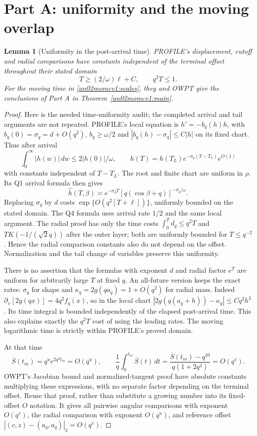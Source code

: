 \documentclass[11pt]{article}
\newtheorem{lemma}[theorem]{Lemma}
\theoremstyle{remark}\newtheorem{remark}[theorem]{Remark}
\newcommand{\dd}{\,d}
\begin{document}
\section{Part A: uniformity and the moving overlap}
\begin{lemma}[Uniformity in the post-arrival time]
\label{an02momcv1:uniformity}
PROFILE's displacement, cutoff and radial comparisons have constants
independent of the terminal offset throughout their stated domain
\[
 T\ge (2/\omega)\ell+C,\qquad q^2T\le1 .
\]
For the moving time in \eqref{an02momcv1:scales}, they and OWPT
give the conclusions of Part A in Theorem~\ref{an02momcv1:main}.
\end{lemma}
\begin{proof}
Here is the needed time-uniformity audit; the completed arrival
and tail arguments are not repeated. PROFILE's local equation is
$h'=-b_q(h)h$, with $b_q(0)=\sigma_q=d+O(q^2)$,
$b_q\ge\omega/2$ and $|b_q(h)-\sigma_q|\le C|h|$ on its fixed
chart. Thus after arrival
\[
 \int_0^\infty |h(w)|\dd w\le2|h(0)|/\omega,\qquad
 h(T)=h(T_L)e^{-\sigma_q(T-T_L)}e^{O(1)}
\]
with constants independent of $T-T_L$. The root and finite chart
are uniform in $\rho$. Its Q1 arrival formula then gives
\[
 \widehat h(T,\beta)\asymp
 e^{-\sigma_q T}[q(\cos\beta+q)]^{-\sigma_q/\omega}.
\]
Replacing $\sigma_q$ by $d$ costs
$\exp\{O(q^2[T+\ell])\}$, uniformly bounded on the stated domain.
The Q4 formula uses arrival rate $1/2$ and the same local argument.
The radial proof has only the time costs
$\int_0^T d_q\le q^2T$ and
$T K(-1/(\sqrt2q))$ after the outer layer; both are uniformly
bounded for $T\le q^{-2}$. Hence the radial comparison constants
also do not depend on the offset. Normalization and the tail
change of variables preserve this uniformity.

There is no assertion that the formulas with exponent $d$ and
radial factor $e^T$ are uniform for arbitrarily large $T$ at
fixed $q$. An all-future version keeps the exact rates:
$\sigma_q$ for shape and
$\kappa_q=2g(qa_q)=1+O(q^2)$ for radial mass. Indeed
$\partial_x[2g(qx)]=4q^2 f_q(x)$, so in the local chart
$|2g(q(a_q+h))-\kappa_q|\le Cq^2h^2$.
Its time integral is bounded independently of the elapsed
post-arrival time. This also explains exactly the $q^2T$ cost
of using the leading rates. The moving logarithmic time is
strictly within PROFILE's proved domain.

At that time
\[
 \overline S(t_m)=q^u e^{2q^2t_m}=O(q^u),\qquad
 \frac1q\int_0^{t_m}\overline S(t)\dd t
 =\frac{\overline S(t_m)-q^{10}}{q(1+2q^2)}=O(q^v).
\]
OWPT's Jacobian bound and normalized-tangent proof have absolute
constants multiplying these expressions, with no separate factor
depending on the terminal offset. Reuse that proof, rather than
substitute a growing number into its fixed-offset $O$ notation.
It gives all pairwise angular comparisons with exponent $O(q^v)$,
the radial comparison with exponent $O(q^u)$, and reference
offset $|(c,z)-(a_q,a_q)|_2=O(q^v)$.


\end{proof}
\end{document}
